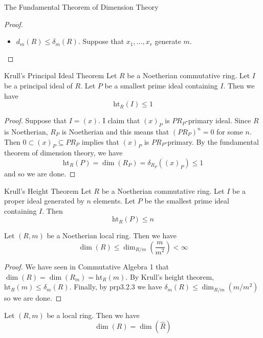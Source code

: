 \documentclass[a4paper]{article}
\begin{document}
\begin{thm}{The Fundamental Theorem of Dimension Theory}{}
\begin{proof}
\begin{itemize}
Finally, under the surjective map $p$, $R/m^n$ is sent to $A/p(m)^n$. Hence $l(R/m^n)\geq l(A/p(m)^n)$ so that $d_m(R)\geq d_m(R/P_0)$. Then combining with the above inequality we deduce that $r-1\leq d_m(R/P_0)-1\leq d_m(R)-1$ so that $r\leq d_m(R)$. Since this is true for all chains of prime ideals of $R$, we deduce that $\dim(R)\leq d_m(R)$. \\~\\

\item $d_m(R)\leq\delta_m(R)$. Suppose that $x_1,\dots,x_r$ generate $m$. 
\end{itemize}
\end{proof}
\end{thm}

\begin{thm}{Krull's Principal Ideal Theorem}{} Let $R$ be a Noetherian commutative ring. Let $I$ be a principal ideal of $R$. Let $P$ be a smallest prime ideal containing $I$. Then we have $$\text{ht}_R(I)\leq 1$$ \tcbline
\begin{proof}
Suppose that $I=(x)$. I claim that $(x)_P$ is $PR_P$-primary ideal. Since $R$ is Noetherian, $R_P$ is Noetherian and this means that $(PR_P)^n=0$ for some $n$. Then $0\subset(x)_P\subseteq PR_P$ implies that $(x)_P$ is $PR_P$-primary. By the fundamental theorem of dimension theory, we have $$\text{ht}_R(P)=\dim(R_P)=\delta_{R_P}((x)_P)\leq 1$$ and so we are done. 
\end{proof}
\end{thm}

\begin{thm}{Krull's Height Theorem}{} Let $R$ be a Noetherian commutative ring. Let $I$ be a proper ideal generated by $n$ elements. Let $P$ be the smallest prime ideal containing $I$. Then $$\text{ht}_R(P)\leq n$$
\end{thm}

\begin{prp}{}{} Let $(R,m)$ be a Noetherian local ring. Then we have $$\dim(R)\leq\dim_{R/m}\left(\frac{m}{m^2}\right)<\infty$$ \tcbline
\begin{proof}
We have seen in Commutative Algebra 1 that $\dim(R)=\dim(R_m)=\text{ht}_R(m)$. By Krull's height theorem, $\text{ht}_R(m)\leq\delta_m(R)$. Finally, by prp3.2.3 we have $\delta_m(R)\leq\dim_{R/m}(m/m^2)$ so we are done. 
\end{proof}
\end{prp}

\begin{prp}{}{} Let $(R,m)$ be a local ring. Then we have $$\dim(R)=\dim(\widehat{R})$$
\end{prp}
\end{document}
